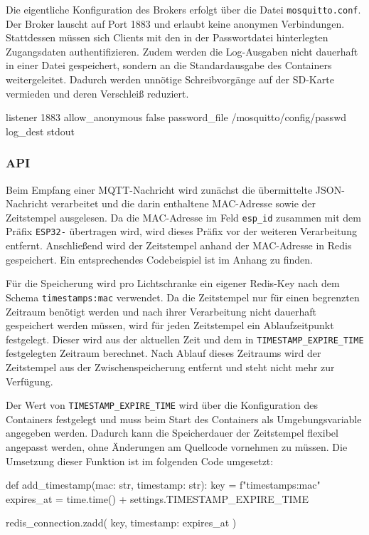 Die eigentliche Konfiguration des Brokers erfolgt über die Datei \texttt{mosquitto.conf}. Der Broker lauscht auf Port 1883 und erlaubt keine anonymen Verbindungen. Stattdessen müssen sich Clients mit den in der Passwortdatei hinterlegten Zugangsdaten authentifizieren. Zudem werden die Log-Ausgaben nicht dauerhaft in einer Datei gespeichert, sondern an die Standardausgabe des Containers weitergeleitet. Dadurch werden unnötige Schreibvorgänge auf der SD-Karte vermieden und deren Verschleiß reduziert.

\begin{CodeBox}
listener 1883
allow_anonymous false
password_file /mosquitto/config/passwd
log_dest stdout
\end{CodeBox}

\newpage

\subsubsection{API}

Beim Empfang einer MQTT-Nachricht wird zunächst die übermittelte JSON-Nachricht verarbeitet und die darin enthaltene MAC-Adresse sowie der Zeitstempel ausgelesen. Da die MAC-Adresse im Feld \texttt{esp\_id} zusammen mit dem Präfix \texttt{ESP32-} übertragen wird, wird dieses Präfix vor der weiteren Verarbeitung entfernt. Anschließend wird der Zeitstempel anhand der MAC-Adresse in Redis gespeichert. Ein entsprechendes Codebeispiel ist im Anhang zu finden.

Für die Speicherung wird pro Lichtschranke ein eigener Redis-Key nach dem Schema \texttt{timestamps:{mac}} verwendet. Da die Zeitstempel nur für einen begrenzten Zeitraum benötigt werden und nach ihrer Verarbeitung nicht dauerhaft gespeichert werden müssen, wird für jeden Zeitstempel ein Ablaufzeitpunkt festgelegt. Dieser wird aus der aktuellen Zeit und dem in \texttt{TIMESTAMP\_EXPIRE\_TIME} festgelegten Zeitraum berechnet. Nach Ablauf dieses Zeitraums wird der Zeitstempel aus der Zwischenspeicherung entfernt und steht nicht mehr zur Verfügung.

Der Wert von \texttt{TIMESTAMP\_EXPIRE\_TIME} wird über die Konfiguration des Containers festgelegt und muss beim Start des Containers als Umgebungsvariable angegeben werden. Dadurch kann die Speicherdauer der Zeitstempel flexibel angepasst werden, ohne Änderungen am Quellcode vornehmen zu müssen.
Die Umsetzung dieser Funktion ist im folgenden Code umgesetzt:

\begin{CodeBox}
def add_timestamp(mac: str, timestamp: str):
    key = f"timestamps:{mac}"
    expires_at = time.time() + settings.TIMESTAMP_EXPIRE_TIME

    redis_connection.zadd(
        key,
        {timestamp: expires_at}
    )
\end{CodeBox}

